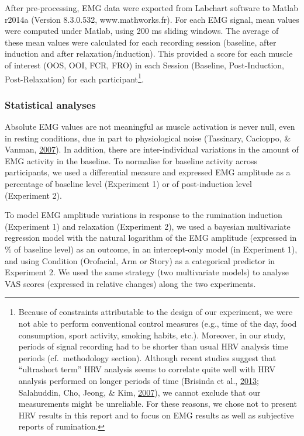 \documentclass[a4paper,12pt,twoside,openright,oldfontcommands]{memoir}
\let\rmarkdownfootnote\footnote%
\def\footnote{\protect\rmarkdownfootnote}
\begin{document}
After pre-processing, EMG data were exported from Labchart software to
Matlab r2014a (Version 8.3.0.532, www.mathworks.fr). For each EMG
signal, mean values were computed under Matlab, using 200 ms sliding
windows. The average of these mean values were calculated for each
recording session (baseline, after induction and after
relaxation/induction). This provided a score for each muscle of interest
(OOS, OOI, FCR, FRO) in each Session (Baseline, Post-Induction,
Post-Relaxation) for each participant\footnote{Because of constraints
  attributable to the design of our experiment, we were not able to
  perform conventional control measures (e.g., time of the day, food
  consumption, sport activity, smoking habits, etc.). Moreover, in our
  study, periods of signal recording had to be shorter than usual HRV
  analysis time periods (cf.~methodology section). Although recent
  studies suggest that ``ultrashort term'' HRV analysis seems to
  correlate quite well with HRV analysis performed on longer periods of
  time (Brisinda et al.,
  \protect\hyperlink{ref-brisinda_comparison_2013}{2013}; Salahuddin,
  Cho, Jeong, \& Kim, \protect\hyperlink{ref-Salahuddin2007}{2007}), we
  cannot exclude that our measurements might be unreliable. For these
  reasons, we chose not to present HRV results in this report and to
  focus on EMG results as well as subjective reports of rumination.}.

\subsubsection{Statistical analyses}\label{statistical-analyses}

Absolute EMG values are not meaningful as muscle activation is never
null, even in resting conditions, due in part to physiological noise
(Tassinary, Cacioppo, \& Vanman,
\protect\hyperlink{ref-berntson_skeletomotor_2007}{2007}). In addition,
there are inter-individual variations in the amount of EMG activity in
the baseline. To normalise for baseline activity across participants, we
used a differential measure and expressed EMG amplitude as a percentage
of baseline level (Experiment 1) or of post-induction level (Experiment
2).

To model EMG amplitude variations in response to the rumination
induction (Experiment 1) and relaxation (Experiment 2), we used a
bayesian multivariate regression model with the natural logarithm of the
EMG amplitude (expressed in \% of baseline level) as an outcome, in an
intercept-only model (in Experiment 1), and using Condition (Orofacial,
Arm or Story) as a categorical predictor in Experiment 2. We used the
same strategy (two multivariate models) to analyse VAS scores (expressed
in relative changes) along the two experiments.
\end{document}
